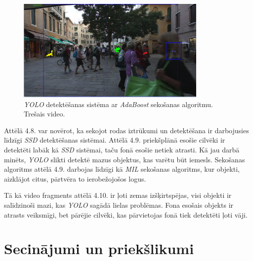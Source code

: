 \begin{figure}[H]%
	\centering
	\includegraphics[height=5cm]{images/yolo3.png} %
	\caption{\textit{YOLO} detektēšanas sistēma ar \textit{AdaBoost} sekošanas algoritmu. Trešais video.}%
	\label{fig:example}%
\end{figure}
\newpage
Attēlā 4.8. var novērot, ka sekojot rodas iztrūkumi un detektēšana ir darbojusies līdzīgi \textit{SSD} detektēšanas sistēmai. Attēlā 4.9. priekšplānā esošie cilvēki ir detektēti labāk kā \textit{SSD} sistēmai, taču fonā esošie netiek atrasti. Kā jau darbā minēts, \textit{YOLO} slikti detektē mazus objektus, kas varētu būt iemesls. Sekošanas algoritms attēlā 4.9. darbojas līdzīgi kā \textit{MIL} sekošanas algoritms, kur objekti, aizklājot citus, pārtvēra to ierobežojošos logus. 

Tā kā video fragments attēlā 4.10. ir ļoti zemas izšķirtspējas, visi objekti ir salīdzinoši mazi, kas \textit{YOLO} sagādā lielas problēmas. Fona esošais objekts ir atrasts veiksmīgi, bet pārējie cilvēki, kas pārvietojas fonā tiek detektēti ļoti vāji.
\chapter{Secinājumi un priekšlikumi}
